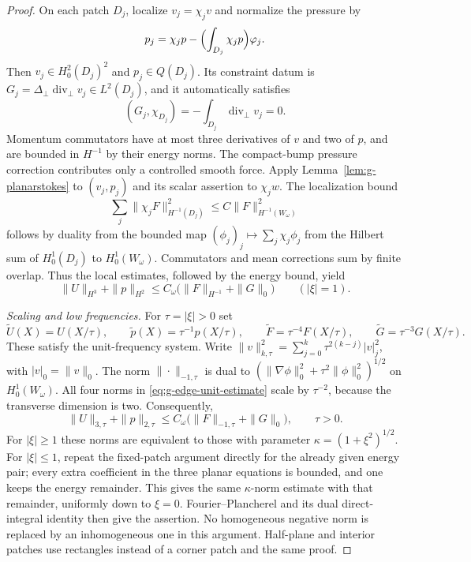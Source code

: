 \documentclass[11pt,a4paper]{article}
\theoremstyle{remark}
\numberwithin{equation}{section}
\begin{document}
\begin{proof}
On each patch $D_j$, localize $v_j=\chi_jv$ and normalize the pressure by
\[
 p_j=\chi_jp-\Bigl(\int_{D_j}\chi_jp\Bigr)\varphi_j.
\]
Then $v_j\in H^2_0(D_j)^2$ and $p_j\in Q(D_j)$. Its constraint datum is
$G_j=\Delta_\perp\operatorname{div}_\perp v_j\in L^2(D_j)$, and it
automatically satisfies
\[
 (G_j,\chi_{D_j})=-\int_{D_j}\operatorname{div}_\perp v_j=0.
\]
Momentum commutators have at most three derivatives of $v$ and two of $p$,
and are bounded in $H^{-1}$ by their energy norms. The compact-bump pressure
correction contributes only a controlled smooth force. Apply
Lemma~\ref{lem:g-planarstokes} to $(v_j,p_j)$ and its scalar assertion to
$\chi_jw$. The localization bound
\[
 \sum_j\|\chi_j F\|_{H^{-1}(D_j)}^2
 \le C\|F\|_{H^{-1}(W_\omega)}^2
\]
follows by duality from the bounded map
$(\phi_j)_j\mapsto\sum_j\chi_j\phi_j$ from the Hilbert sum of
$H^1_0(D_j)$ to $H^1_0(W_\omega)$. Commutators and mean corrections sum by
finite overlap. Thus the local estimates, followed by the energy bound, yield
\begin{equation}\label{eq:g-edge-unit-estimate}
 \|U\|_{H^3}+\|p\|_{H^2}
 \le C_\omega\bigl(\|F\|_{H^{-1}}+\|G\|_0\bigr)
 \qquad(|\xi|=1).
\end{equation}

\emph{Scaling and low frequencies.}
For $\tau=|\xi|>0$ set
\begin{equation}\label{eq:g-edge-fourier-rescaling}
 \widetilde U(X)=U(X/\tau),\qquad
 \widetilde p(X)=\tau^{-1}p(X/\tau),\qquad
 \widetilde F=\tau^{-4}F(X/\tau),\qquad
 \widetilde G=\tau^{-3}G(X/\tau).
\end{equation}
These satisfy the unit-frequency system. Write
$\|v\|_{k,\tau}^2=\sum_{j=0}^k\tau^{2(k-j)}|v|_j^2$, with
$|v|_0=\|v\|_0$. The norm $\|\cdot\|_{-1,\tau}$ is dual to
$(\|\nabla\phi\|_0^2+\tau^2\|\phi\|_0^2)^{1/2}$ on
$H^1_0(W_\omega)$. All four norms in
\eqref{eq:g-edge-unit-estimate} scale by $\tau^{-2}$, because the
transverse dimension is two. Consequently,
\begin{equation}\label{eq:g-edge-scaled-estimate}
 \|U\|_{3,\tau}+\|p\|_{2,\tau}
 \le C_\omega\bigl(\|F\|_{-1,\tau}+\|G\|_0\bigr),\qquad\tau>0.
\end{equation}
For $|\xi|\ge1$ these norms are equivalent to those with parameter
$\kappa=(1+\xi^2)^{1/2}$. For $|\xi|\le1$, repeat the fixed-patch argument
directly for the already given energy pair; every extra coefficient in the
three planar equations is bounded, and one keeps the energy remainder.
This gives the same $\kappa$-norm estimate with that remainder, uniformly down
to $\xi=0$. Fourier--Plancherel and its dual direct-integral identity then
give the assertion. No homogeneous negative norm is replaced by an
inhomogeneous one in this argument. Half-plane and interior patches use
rectangles instead of a corner patch and the same proof.
\end{proof}
\end{document}

